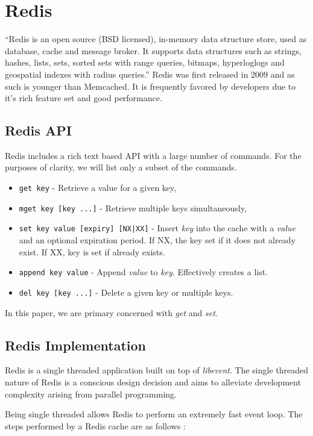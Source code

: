 \section{Redis}
``Redis is an open source (BSD licensed), in-memory data structure store, used as database, cache and message broker. It supports data structures such as strings, hashes, lists, sets, sorted sets with range queries, bitmaps, hyperloglogs and geospatial indexes with radius queries.'' \cite{redis} Redis was first released in 2009 and as such is younger than Memcached. It is frequently favored by developers due to it's rich feature set and good performance.

\subsection{Redis API}
Redis includes a rich text based API with a large number of commands. For the purposes of clarity, we will list only a subset of the commands.

\begin{itemize}
    \item \texttt{get key} - Retrieve a value for a given key,
    \item \texttt{mget key [key ...]} - Retrieve multiple keys simultaneously,
    \item \texttt{set key value [expiry] [NX|XX]} - Insert \textit{key} into the cache with a \textit{value} and an optional expiration period. If NX, the key set if it does not already exist. If XX, key is set if already exists.
    \item \texttt{append key value} - Append \textit{value} to \textit{key}. Effectively creates a list.
    \item \texttt{del key [key ...]} - Delete a given key or multiple keys.
\end{itemize}

In this paper, we are primary concerned with \textit{get} and \textit{set}.

\subsection{Redis Implementation}
Redis is a single threaded application built on top of \textit{libevent}. The single threaded nature of Redis is a conscious design decision and aims to alleviate development complexity arising from parallel programming.

Being single threaded allows Redis to perform an extremely fast event loop. The steps performed by a Redis cache are as follows \cite{redisUnderTheHood}:

